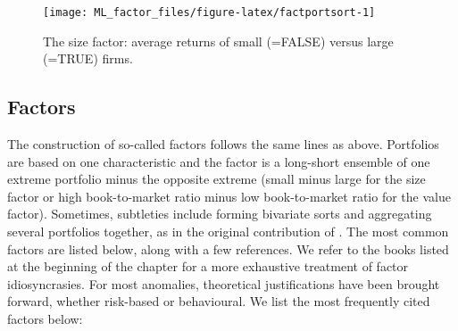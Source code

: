 \documentclass[]{krantz}
\theoremstyle{definition}
\theoremstyle{definition}
\theoremstyle{definition}
\theoremstyle{remark}
\begin{document}
\begin{figure}[H]

{\centering \texttt{[image: ML\_factor\_files/figure-latex/factportsort-1]} 

}

\caption{The size factor: average returns of small (=FALSE) versus large (=TRUE) firms.}\label{fig:factportsort}
\end{figure}

\normalsize

\hypertarget{factors}{%
\subsection{Factors}\label{factors}}

The construction of so-called factors follows the same lines as above.
Portfolios are based on one characteristic and the factor is a
long-short ensemble of one extreme portfolio minus the opposite extreme
(small minus large for the size factor or high book-to-market ratio
minus low book-to-market ratio for the value factor). Sometimes,
subtleties include forming bivariate sorts and aggregating several
portfolios together, as in the original contribution of
\citet{fama1993common}. The most common factors are listed below, along
with a few references. We refer to the books listed at the beginning of
the chapter for a more exhaustive treatment of factor idiosyncrasies.
For most anomalies, theoretical justifications have been brought
forward, whether risk-based or behavioural. We list the most frequently
cited factors below:
\end{document}
